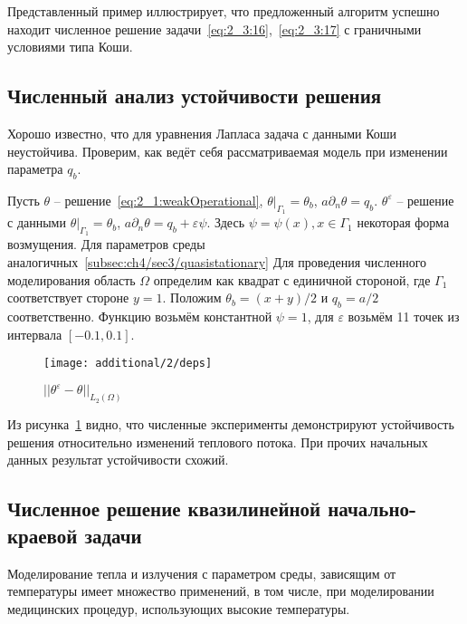 Представленный пример иллюстрирует, что предложенный
алгоритм успешно находит численное решение
задачи~\eqref{eq:2_3:16},~\eqref{eq:2_3:17} с граничными
условиями типа Коши.

\subsection{Численный анализ устойчивости решения}
\label{subsec:ch4/sec3/robustness}
Хорошо известно, что для уравнения Лапласа задача с данными Коши неустойчива.
Проверим, как ведёт себя рассматриваемая модель при изменении параметра $q_b$.

Пусть $\theta$ -- решение~\eqref{eq:2_1:weakOperational},
$\theta|_{\Gamma_1} = \theta_b$, $a\partial_n \theta = q_b$.
$\theta^\varepsilon$ -- решение с данными
$\theta|_{\Gamma_1} = \theta_b$, $a\partial_n \theta = q_b +\varepsilon \psi$.
Здесь $\psi = \psi(x), x \in \Gamma_1$ некоторая форма возмущения.
Для параметров среды аналогичных~\ref{subsec:ch4/sec3/quasistationary}
Для проведения численного моделирования область $\Omega$ определим
как квадрат с единичной стороной, где $\Gamma_1$ соответствует стороне $y = 1$.
Положим $\theta_b = (x + y) / 2$ и $q_b = a / 2$ соответственно.
Функцию возьмём константной $\psi = 1$, для $\varepsilon$ возьмём 11 точек из интервала
$[-0.1, 0.1]$.

\begin{figure}[h!t]
    \begin{minipage}[b][][b]{0.9\linewidth}
        \centering
        \texttt{[image: additional/2/deps]}
    \end{minipage}
    \hfill
    \caption{$||\theta^\varepsilon - \theta||_{L_2(\Omega)}$}
    \label{fig:4_3:vareps}
\end{figure}

Из рисунка~\ref{fig:4_3:vareps} видно, что численные эксперименты демонстрируют
устойчивость решения относительно изменений теплового потока.
При прочих начальных данных результат устойчивости схожий.

%

\subsection{Численное решение квазилинейной начально-краевой задачи}
\label{subsec:ch4/sec3/quasilinear}
Моделирование тепла и излучения с параметром среды, зависящим от температуры
имеет множество применений, в том числе, при моделировании медицинских процедур,
использующих высокие температуры.

